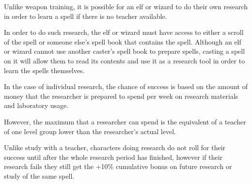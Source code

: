 \begin{multicols*}{2}

Unlike weapon training, it is possible for an elf or wizard to do their own research in order to learn a spell if there is no teacher available.

In order to do such research, the elf or wizard must have access to either a scroll of the spell or someone else’s spell book that contains the spell. Although an elf or wizard cannot use another caster’s spell book to prepare spells, casting a  spell on it will allow them to read its contents and use it as a research tool in order to learn the spells themselves.

In the case of individual research, the chance of success is based on the amount of money that the researcher is prepared to spend per week on research materials and laboratory usage.

However, the maximum that a researcher can spend is the equivalent of a teacher of one level group lower than the researcher’s actual level.

Unlike study with a teacher, characters doing research do not roll for their success until after the whole research period has finished, however if their research fails they still get the +10\% cumulative bonus on future research or study of the same spell.

\end{multicols*}
